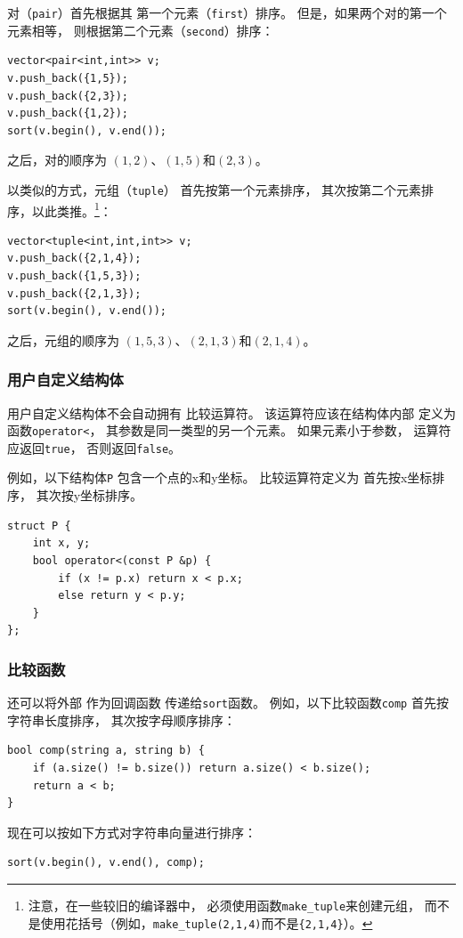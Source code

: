 
对（\texttt{pair}）首先根据其
第一个元素（\texttt{first}）排序。
但是，如果两个对的第一个元素相等，
则根据第二个元素（\texttt{second}）排序：
\begin{lstlisting}
vector<pair<int,int>> v;
v.push_back({1,5});
v.push_back({2,3});
v.push_back({1,2});
sort(v.begin(), v.end());
\end{lstlisting}
之后，对的顺序为
$(1,2)$、$(1,5)$和$(2,3)$。


以类似的方式，元组（\texttt{tuple}）
首先按第一个元素排序，
其次按第二个元素排序，以此类推。\footnote{注意，在一些较旧的编译器中，
必须使用函数\texttt{make\_tuple}来创建元组，
而不是使用花括号（例如，\texttt{make\_tuple(2,1,4)}而不是\texttt{\{2,1,4\}}）。}：
\begin{lstlisting}
vector<tuple<int,int,int>> v;
v.push_back({2,1,4});
v.push_back({1,5,3});
v.push_back({2,1,3});
sort(v.begin(), v.end());
\end{lstlisting}
之后，元组的顺序为
$(1,5,3)$、$(2,1,3)$和$(2,1,4)$。

\subsubsection{用户自定义结构体}

用户自定义结构体不会自动拥有
比较运算符。
该运算符应该在结构体内部
定义为函数\texttt{operator<}，
其参数是同一类型的另一个元素。
如果元素小于参数，
运算符应返回\texttt{true}，
否则返回\texttt{false}。

例如，以下结构体\texttt{P}
包含一个点的x和y坐标。
比较运算符定义为
首先按x坐标排序，
其次按y坐标排序。

\begin{lstlisting}
struct P {
    int x, y;
    bool operator<(const P &p) {
        if (x != p.x) return x < p.x;
        else return y < p.y;
    }
};
\end{lstlisting}

\subsubsection{比较函数}


还可以将外部
作为回调函数
传递给\texttt{sort}函数。
例如，以下比较函数\texttt{comp}
首先按字符串长度排序，
其次按字母顺序排序：

\begin{lstlisting}
bool comp(string a, string b) {
    if (a.size() != b.size()) return a.size() < b.size();
    return a < b;
}
\end{lstlisting}
现在可以按如下方式对字符串向量进行排序：
\begin{lstlisting}
sort(v.begin(), v.end(), comp);
\end{lstlisting}

